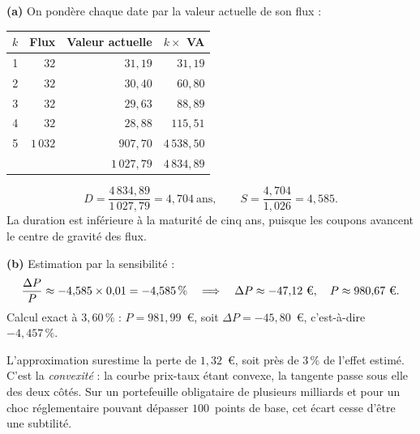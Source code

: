 \begin{corrige}
\textbf{(a)} On pondère chaque date par la valeur actuelle de son flux :
\begin{center}\small
\begin{tabular}{crrr}
\toprule
$k$ & Flux & Valeur actuelle & $k \times$ VA \\
\midrule
1 & $32$    & $31{,}19$  & $31{,}19$ \\
2 & $32$    & $30{,}40$  & $60{,}80$ \\
3 & $32$    & $29{,}63$  & $88{,}89$ \\
4 & $32$    & $28{,}88$  & $115{,}51$ \\
5 & $1\,032$ & $907{,}70$ & $4\,538{,}50$ \\
\midrule
  & & $1\,027{,}79$ & $4\,834{,}89$ \\
\bottomrule
\end{tabular}
\end{center}
\[
  D = \frac{4\,834{,}89}{1\,027{,}79} = 4{,}704\ \text{ans},
  \qquad
  S = \frac{4{,}704}{1{,}026} = 4{,}585 .
\]
La duration est inférieure à la maturité de cinq ans, puisque les coupons
avancent le centre de gravité des flux.

\medskip
\textbf{(b)} Estimation par la sensibilité :
\[
  \frac{\Delta P}{P} \approx -4{,}585 \times 0{,}01 = -4{,}585\,\%
  \quad\Longrightarrow\quad
  \Delta P \approx -47{,}12\ \text{\euro},
  \quad P \approx 980{,}67\ \text{\euro}.
\]
Calcul exact à $3{,}60\,\%$ : $P = 981{,}99$~\euro, soit $\Delta P = -45{,}80$~\euro,
c'est-à-dire $-4{,}457\,\%$.

\medskip
L'approximation surestime la perte de $1{,}32$~\euro, soit près de $3\,\%$ de
l'effet estimé. C'est la \emph{convexité} : la courbe prix-taux étant convexe,
la tangente passe sous elle des deux côtés. Sur un portefeuille obligataire de
plusieurs milliards et pour un choc réglementaire pouvant dépasser $100$~points
de base, cet écart cesse d'être une subtilité.
\end{corrige}

